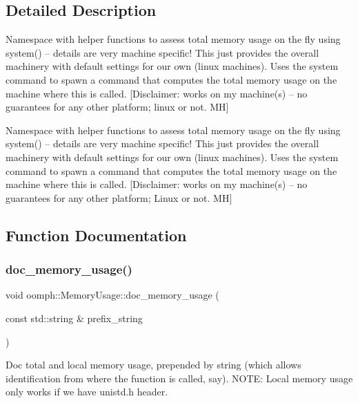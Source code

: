 \subsection{Detailed Description}
Namespace with helper functions to assess total memory usage on the fly using system() -- details are very machine specific! This just provides the overall machinery with default settings for our own (linux machines). Uses the system command to spawn a command that computes the total memory usage on the machine where this is called. \mbox{[}Disclaimer\+: works on my machine(s) -- no guarantees for any other platform; linux or not. MH\mbox{]}

Namespace with helper functions to assess total memory usage on the fly using system() -- details are very machine specific! This just provides the overall machinery with default settings for our own (linux machines). Uses the system command to spawn a command that computes the total memory usage on the machine where this is called. \mbox{[}Disclaimer\+: works on my machine(s) -- no guarantees for any other platform; Linux or not. MH\mbox{]} 

\subsection{Function Documentation}
\mbox{\label{namespaceoomph_1_1MemoryUsage_aa714e9e49de96f4ca6a9fd7ae99dbeab}} 
\subsubsection{\texorpdfstring{doc\+\_\+memory\+\_\+usage()}{doc\_memory\_usage()}}
{\footnotesize\ttfamily void oomph\+::\+Memory\+Usage\+::doc\+\_\+memory\+\_\+usage (\begin{DoxyParamCaption}\item[{const std\+::string \&}]{prefix\+\_\+string }\end{DoxyParamCaption})}



Doc total and local memory usage, prepended by string (which allows identification from where the function is called, say). N\+O\+TE\+: Local memory usage only works if we have unistd.\+h header. 

